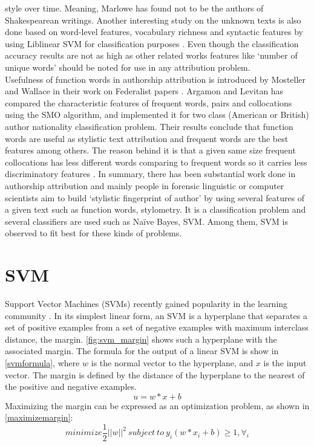 style over time. Meaning, Marlowe has found not to be the authors of Shakespearean
writings.
Another interesting study on the unknown texts is also
done based on word-level features, vocabulary richness and syntactic features by using
Liblinear SVM for classification purposes \cite{stanko2013whose}. Even though the classification accuracy
results are not as high as other related works features like \enquote*{number of unique words}
should be noted for use in any attribution problem.\\
Usefulness of function words in authorship attribution is introduced by Mosteller
and Wallace in their work on Federalist papers \cite{mosteller2007inference}. Argamon and Levitan has compared the characteristic features of frequent words, pairs and collocations using the
SMO algorithm, and implemented it for two class (American or British) author nationality classification problem. Their results conclude that function words are useful
as stylistic text attribution and frequent words are the best features among others.
The reason behind it is that a given same size frequent collocations has less different
words comparing to frequent words so it carries less discriminatory features \cite{argamon2005measuring}.
In summary, there has been substantial work done in authorship attribution and
mainly people in forensic linguistic or computer scientists aim to build \enquote*{stylistic fingerprint of author} by using several features of a given text such as function words,
stylometry. It is a classification problem and several classifiers are used such as Na\"ive
Bayes, SVM. Among them, SVM is observed to fit best for these kinds of problems.

\section{SVM}
Support Vector Machines (SVMs) recently gained popularity in the learning community \cite{vapnik1999overview}. In its simplest
linear form, an SVM is a hyperplane that separates
a set of positive examples from a set of negative examples with maximum interclass distance, the margin.
\autoref{fig:svm_margin} shows such a hyperplane with the associated
margin.
The formula for the output of a linear SVM is show in \autoref{svmformula}, where $w$ is the normal vector to the hyperplane, and $x$ is the input vector. The margin is defined by the distance of the hyperplane to the nearest of the positive
and negative examples.
\begin{equation}\label{svmformula}
	u = w * x + b
\end{equation}
Maximizing the margin can be
expressed as an optimization problem, as shown in  \autoref{maximizemargin}:
\begin{equation}\label{maximizemargin}
	minimize\frac{1}{2}||w||^2\ subject\ to\ y_i(w*x_i+b)\geq 1, \forall_i
\end{equation}

